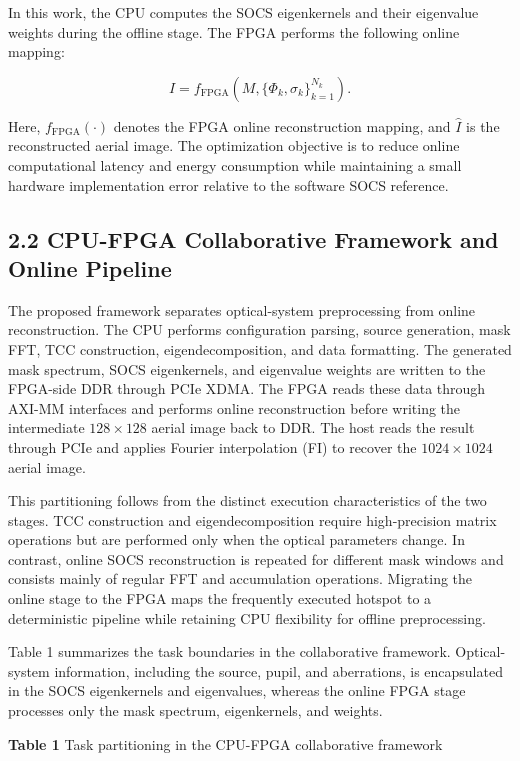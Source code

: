 \documentclass[
  preprint]{elsarticle}
\begin{document}
In this work, the CPU computes the SOCS eigenkernels and their
eigenvalue weights during the offline stage. The FPGA performs the
following online mapping:

\[
\hat{I}=f_{\mathrm{FPGA}}(M,\{\Phi_k,\sigma_k\}_{k=1}^{N_k}).
\tag{6}
\]

Here, \(f_{\mathrm{FPGA}}(\cdot)\) denotes the FPGA online
reconstruction mapping, and \(\hat{I}\) is the reconstructed aerial
image. The optimization objective is to reduce online computational
latency and energy consumption while maintaining a small hardware
implementation error relative to the software SOCS reference.

\subsection{2.2 CPU-FPGA Collaborative Framework and Online
Pipeline}\label{cpu-fpga-collaborative-framework-and-online-pipeline}

The proposed framework separates optical-system preprocessing from
online reconstruction. The CPU performs configuration parsing, source
generation, mask FFT, TCC construction, eigendecomposition, and data
formatting. The generated mask spectrum, SOCS eigenkernels, and
eigenvalue weights are written to the FPGA-side DDR through PCIe XDMA.
The FPGA reads these data through AXI-MM interfaces and performs online
reconstruction before writing the intermediate \(128 \times 128\) aerial
image back to DDR. The host reads the result through PCIe and applies
Fourier interpolation (FI) to recover the \(1024 \times 1024\) aerial
image.

This partitioning follows from the distinct execution characteristics of
the two stages. TCC construction and eigendecomposition require
high-precision matrix operations but are performed only when the optical
parameters change. In contrast, online SOCS reconstruction is repeated
for different mask windows and consists mainly of regular FFT and
accumulation operations. Migrating the online stage to the FPGA maps the
frequently executed hotspot to a deterministic pipeline while retaining
CPU flexibility for offline preprocessing.

Table 1 summarizes the task boundaries in the collaborative framework.
Optical-system information, including the source, pupil, and
aberrations, is encapsulated in the SOCS eigenkernels and eigenvalues,
whereas the online FPGA stage processes only the mask spectrum,
eigenkernels, and weights.

\textbf{Table 1} Task partitioning in the CPU-FPGA collaborative
framework
\end{document}
